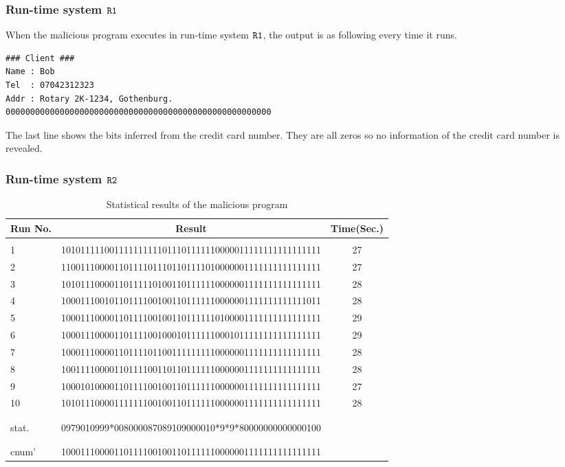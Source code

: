 \documentclass[a4paper]{report}
\newcommand{\co}[1]{$\cod{#1}$}
\begin{document}
\subsubsection{Run-time system \co{R1}}
When the malicious program executes in run-time system \co{R1}, the output is as following every
time it runs.
\begin{Verbatim}[fontsize=\footnotesize]
### Client ###
Name : Bob
Tel  : 07042312323
Addr : Rotary 2K-1234, Gothenburg.
000000000000000000000000000000000000000000000000000000
\end{Verbatim}
The last line shows the bits inferred from the credit card number. They are all zeros so no information of
the credit card number is revealed.

\subsubsection{Run-time system \co{R2}}

\begin{table}[t]
\centering
\begin{tabular}{lcc}
{\bf Run No}. & {\bf Result} & {\bf Time}({\bf Sec}.) \\ \hline \\
1  & 101011111001111111111011101111110000011111111111111111 & 27 \\
2  & 110011100001101111011101101111010000001111111111111111 & 27 \\
3  & 101011100001101111101001101111110000001111111111111111 & 28 \\ 
4  & 100011100101101111001001101111110000001111111111111011 & 28 \\
5  & 100011100001101111001001101111110100001111111111111111 & 29 \\
6  & 100011100001101111001000101111110001011111111111111111 & 29 \\
7  & 100011100001101111011001111111110000001111111111111111 & 28 \\
8  & 100111100001101111001101101111110000001111111111111111 & 28 \\
9  & 100010100001101111001001101111110000001111111111111111 & 27 \\
10 & 101011100001111111001001101111110000001111111111111111 & 28 \\
\\ \hline \\
stat.   & 0979010999*008000087089109000010*9*9*80000000000000100 &    \\
\\ \hline \\
cnum' & 100011100001101111001001101111110000001111111111111111 & \\
\end{tabular}
\caption{Statistical results of the malicious program}
\label{table:chap8:shopping}
\end{table}
\end{document}
